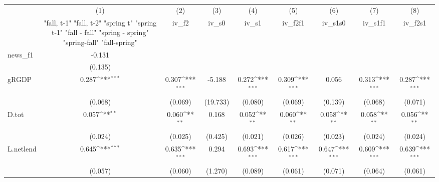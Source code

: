 {
\def\sym#1{\ifmmode^{#1}\else\(^{#1}\)\fi}
\begin{tabular}{l*{8}{c}}
\toprule
            &\multicolumn{1}{c}{(1)}&\multicolumn{1}{c}{(2)}&\multicolumn{1}{c}{(3)}&\multicolumn{1}{c}{(4)}&\multicolumn{1}{c}{(5)}&\multicolumn{1}{c}{(6)}&\multicolumn{1}{c}{(7)}&\multicolumn{1}{c}{(8)}\\
            &\multicolumn{1}{c}{  "fall, t-1" "fall, t-2" "spring t" "spring t-1"  "fall - fall" "spring - spring" "spring-fall" "fall-spring" }&\multicolumn{1}{c}{iv\_f2}&\multicolumn{1}{c}{iv\_s0}&\multicolumn{1}{c}{iv\_s1}&\multicolumn{1}{c}{iv\_f2f1}&\multicolumn{1}{c}{iv\_s1s0}&\multicolumn{1}{c}{iv\_s1f1}&\multicolumn{1}{c}{iv\_f2s1}\\
\midrule
news\_f1     &      -0.131         &                     &                     &                     &                     &                     &                     &                     \\
            &     (0.135)         &                     &                     &                     &                     &                     &                     &                     \\
\addlinespace
gRGDP       &       0.287\sym{***}&       0.307\sym{***}&      -5.188         &       0.272\sym{***}&       0.309\sym{***}&       0.056         &       0.313\sym{***}&       0.287\sym{***}\\
            &     (0.068)         &     (0.069)         &    (19.733)         &     (0.080)         &     (0.069)         &     (0.139)         &     (0.068)         &     (0.071)         \\
\addlinespace
D.tot       &       0.057\sym{**} &       0.060\sym{**} &       0.168         &       0.052\sym{**} &       0.060\sym{**} &       0.058\sym{**} &       0.058\sym{**} &       0.056\sym{**} \\
            &     (0.024)         &     (0.025)         &     (0.425)         &     (0.021)         &     (0.026)         &     (0.023)         &     (0.024)         &     (0.024)         \\
\addlinespace
L.netlend   &       0.645\sym{***}&       0.635\sym{***}&       0.294         &       0.693\sym{***}&       0.617\sym{***}&       0.647\sym{***}&       0.609\sym{***}&       0.639\sym{***}\\
            &     (0.057)         &     (0.060)         &     (1.270)         &     (0.089)         &     (0.061)         &     (0.071)         &     (0.064)         &     (0.061)         \\

\end{tabular}}
